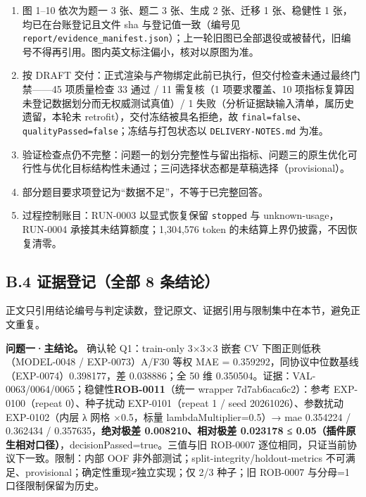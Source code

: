 \documentclass[11pt,a4paper]{article}
\providecommand{\tightlist}{%
  \setlength{\itemsep}{0pt}\setlength{\parskip}{0pt}}
\begin{document}
\begin{enumerate}
\def\labelenumi{\arabic{enumi}.}
\tightlist
\item
  图 1--10 依次为题一 3 张、题二 3 张、生成 2 张、迁移 1 张、稳健性 1
  张，均已在台账登记且文件 sha 与登记值一致（编号见
  \texttt{report/\allowbreak{}evidence\_manifest.json}）；上一轮旧图已全部退役或被替代，旧编号不得再引用。图内英文标注偏小，核对以原图为准。
\item
  按 DRAFT
  交付：正式渲染与产物绑定此前已执行，但交付检查未通过最终门禁------45
  项质量检查 33 通过 / 11 需复核（1 项要求覆盖、10
  项指标复算因未登记数据划分而无权威测试真值）/ 1
  失败（分析证据缺输入清单，属历史遗留，本轮未
  retrofit），交付冻结被具名拒绝，故
  \texttt{final=false}、\texttt{qualityPassed=false}；冻结与打包状态以
  \texttt{DELIVERY-\allowbreak{}NOTES.md} 为准。
\item
  验证检查点仍不完整：问题一的划分完整性与留出指标、问题三的原生优化可行性与优化目标结构性未通过；三问选择状态都是草稿选择（provisional）。
\item
  部分题目要求项登记为``数据不足''，不等于已完整回答。
\item
  过程控制账目：RUN-0003 以显式恢复保留 \texttt{stopped} 与
  unknown-usage，RUN-0004 承接其未结算额度；1,304,576 token
  的未结算上界仍披露，不因恢复清零。
\end{enumerate}

\subsection*{B.4 证据登记（全部 8
条结论）}\label{b.4-ux8bc1ux636eux767bux8bb0ux5168ux90e8-8-ux6761ux7ed3ux8bba}

正文只引用结论编号与判定读数，登记原文、证据引用与限制集中在本节，避免正文重复。

\textbf{问题一·主结论。} 确认轮 Q1：train-only 3×3×3 嵌套 CV
下图正则低秩（MODEL-0048 / EXP-0073）A/F30 等权 MAE =
0.359292，同协议中位数基线（EXP-0074）0.398177，差 0.038886；全 50 维
0.350504。证据：VAL-0063/0064/0065；稳健性\textbf{ROB-0011}（统一
wrapper 7d7ab6aca6c2）：参考 EXP-0100（repeat 0）、种子扰动
EXP-0101（repeat 1 / seed 20261026）、参数扰动 EXP-0102（内层 λ 网格
×0.5，标量 lambdaMultiplier=0.5）→ mae 0.354224 / 0.362434 /
0.357635，\textbf{绝对极差 0.008210、相对极差 0.023178 ≤
0.05（插件原生相对口径）}，decisionPassed=true。三值与旧 ROB-0007
逐位相同，只证当前协议下一致。限制：内部 OOF
非外部测试；split-integrity/holdout-metrics
不可满足、provisional；确定性重现≠独立实现；仅 2/3 种子；旧 ROB-0007
与分母=1 口径限制保留为历史。
\end{document}
